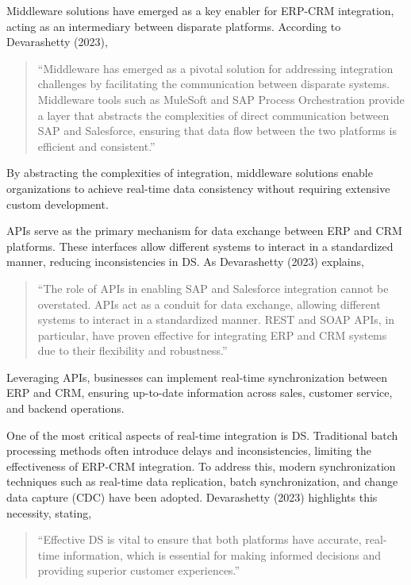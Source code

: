 Middleware solutions have emerged as a key enabler for ERP-CRM integration, acting as an intermediary between disparate platforms. According to Devarashetty (2023), 
\begin{quote}
    ``Middleware has emerged as a pivotal solution for addressing integration challenges by facilitating the communication between disparate systems. Middleware tools such as MuleSoft and SAP Process Orchestration provide a layer that abstracts the complexities of direct communication between SAP and Salesforce, ensuring that data flow between the two platforms is efficient and consistent.'' \cite{devarashetty2023}
\end{quote}
By abstracting the complexities of integration, middleware solutions enable organizations to achieve real-time data consistency without requiring extensive custom development.

APIs serve as the primary mechanism for data exchange between ERP and CRM platforms. These interfaces allow different systems to interact in a standardized manner, reducing inconsistencies in DS. As Devarashetty (2023) explains, 
\begin{quote}
    ``The role of APIs in enabling SAP and Salesforce integration cannot be overstated. APIs act as a conduit for data exchange, allowing different systems to interact in a standardized manner. REST and SOAP APIs, in particular, have proven effective for integrating ERP and CRM systems due to their flexibility and robustness.'' \cite{devarashetty2023}
\end{quote}
Leveraging APIs, businesses can implement real-time synchronization between ERP and CRM, ensuring up-to-date information across sales, customer service, and backend operations.

One of the most critical aspects of real-time integration is DS. Traditional batch processing methods often introduce delays and inconsistencies, limiting the effectiveness of ERP-CRM integration. To address this, modern synchronization techniques such as real-time data replication, batch synchronization, and change data capture (CDC) have been adopted. Devarashetty (2023) highlights this necessity, stating, 
\begin{quote}
    ``Effective DS is vital to ensure that both platforms have accurate, real-time information, which is essential for making informed decisions and providing superior customer experiences.'' \cite{devarashetty2023}
\end{quote}

